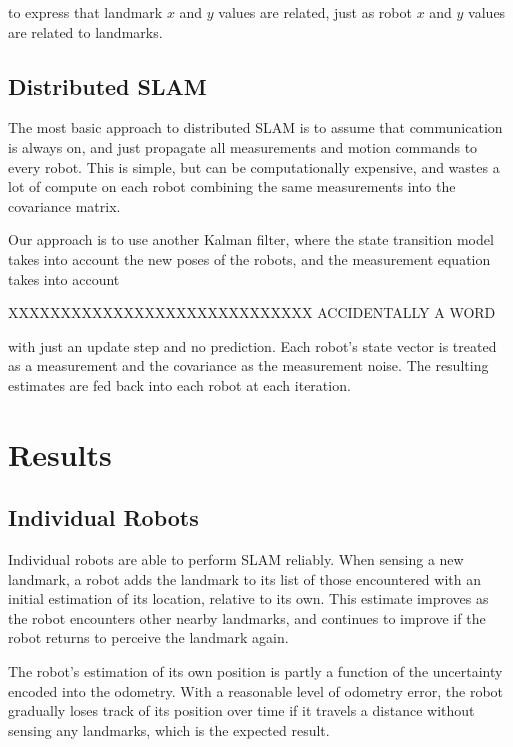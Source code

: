 \documentclass[prodmode,acmtecs]{acmsmall} %
\begin{document}
to express that landmark $x$ and $y$ values are related, just as robot $x$ and $y$ values are related to landmarks.

\subsection{Distributed SLAM}

The most basic approach to distributed SLAM is to assume that communication is always on, and just propagate all measurements and motion commands to every robot. This is simple, but can be computationally expensive, and wastes a lot of compute on each robot combining the same measurements into the covariance matrix.

Our approach is to use another Kalman filter, where the state transition model takes into account the new poses of the robots, and the measurement equation takes into account

XXXXXXXXXXXXXXXXXXXXXXXXXXXXX ACCIDENTALLY A WORD

with just an update step and no prediction.  Each robot's state vector is treated as a measurement and the covariance as the measurement noise. The resulting estimates are fed back into each robot at each iteration.

\section{Results}

\subsection{Individual Robots}

Individual robots are able to perform SLAM reliably.  When sensing a new landmark, a robot adds the landmark to its list of those encountered with an initial estimation of its location, relative to its own.  This estimate improves as the robot encounters other nearby landmarks, and continues to improve if the robot returns to perceive the landmark again.

The robot's estimation of its own position is partly a function of the uncertainty encoded into the odometry.  With a reasonable level of odometry error, the robot gradually loses track of its position over time if it travels a distance without sensing any landmarks, which is the expected result.
\end{document}
